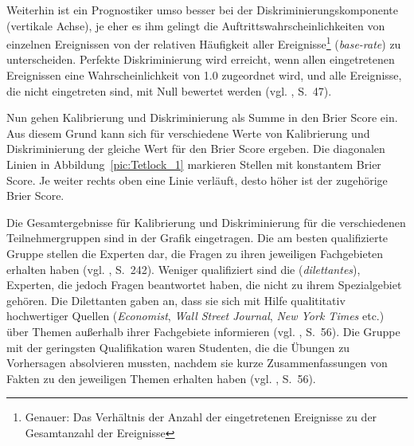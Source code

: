 Weiterhin ist ein Prognostiker umso besser bei der Diskriminierungskomponente
(vertikale Achse),
je eher es ihm gelingt die Auftrittswahrscheinlichkeiten von einzelnen
Ereignissen von der relativen Häufigkeit aller Ereignisse\footnote{
Genauer: Das Verhältnis der Anzahl der eingetretenen Ereignisse zu der
Gesamtanzahl der Ereignisse} (\emph{base-rate})
zu unterscheiden. Perfekte Diskriminierung wird erreicht, wenn allen 
eingetretenen Ereignissen eine Wahrscheinlichkeit von 1.0 zugeordnet wird, und
alle Ereignisse, die nicht eingetreten sind, mit Null bewertet werden
(vgl. \cite{Tetlock}, S.~47).

Nun gehen Kalibrierung und Diskriminierung als Summe in den
Brier Score ein. Aus diesem Grund kann sich für verschiedene
Werte von Kalibrierung und Diskriminierung der gleiche Wert für den
Brier Score ergeben. Die diagonalen Linien in Abbildung~\ref{pic:Tetlock_1}
markieren Stellen mit konstantem Brier Score. Je weiter rechts oben
eine Linie verläuft, desto höher ist der zugehörige Brier Score.

Die Gesamtergebnisse für Kalibrierung und Diskriminierung für die verschiedenen
Teilnehmergruppen sind in der Grafik eingetragen. Die am besten qualifizierte
Gruppe stellen die Experten dar, die Fragen zu ihren jeweiligen Fachgebieten
erhalten haben (vgl. \cite{Tetlock}, S.~242). Weniger qualifiziert sind die 
\grqq (\emph{dilettantes}), Experten, die jedoch Fragen
beantwortet haben, die nicht zu ihrem Spezialgebiet gehören. Die Dilettanten
gaben an, dass sie sich mit Hilfe qualititativ hochwertiger Quellen
(\emph{Economist}, \emph{Wall Street Journal}, \emph{New York Times} etc.) über
Themen außerhalb ihrer Fachgebiete informieren (vgl. \cite{Tetlock}, S.~56).
Die Gruppe mit der geringsten Qualifikation waren Studenten, die die Übungen
zu Vorhersagen absolvieren mussten, nachdem sie kurze Zusammenfassungen von
Fakten zu den jeweiligen Themen erhalten haben (vgl. \cite{Tetlock}, S.~56).

